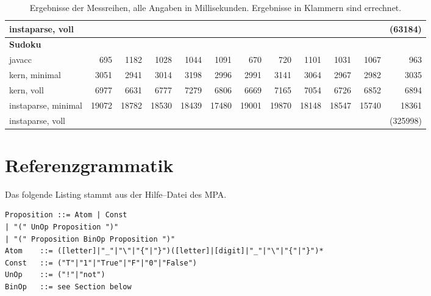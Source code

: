 \documentclass[ngerman,a4paper,abstracton,open=right,twoside=false,toc=listofnumbered,bibtotocnumbered]{scrreprt}
\begin{document}
\begin{table}[!h]
{{\begin{tabular}{|l|r|r|r|r|r|r|r|r|r|r|r|}
				instaparse, voll   & \multicolumn{1}{l|}{} & \multicolumn{1}{l|}{} & \multicolumn{1}{l|}{} & \multicolumn{1}{l|}{} & \multicolumn{1}{l|}{} & \multicolumn{1}{l|}{} & \multicolumn{1}{l|}{} & \multicolumn{1}{l|}{} & \multicolumn{1}{l|}{} & \multicolumn{1}{l|}{} & (63184) \\ \hline
				\textbf{Sudoku} & \multicolumn{1}{l|}{} & \multicolumn{1}{l|}{} & \multicolumn{1}{l|}{} & \multicolumn{1}{l|}{} & \multicolumn{1}{l|}{} & \multicolumn{1}{l|}{} & \multicolumn{1}{l|}{} & \multicolumn{1}{l|}{} & \multicolumn{1}{l|}{} & \multicolumn{1}{l|}{} & \multicolumn{1}{l|}{} \\ \hline
				javacc  & 695 & 1182 & 1028 & 1044 & 1091 & 670 & 720 & 1101 & 1031 & 1067 & 963 \\ \hline
				kern, minimal   & 3051 & 2941 & 3014 & 3198 & 2996 & 2991 & 3141 & 3064 & 2967 & 2982 & 3035 \\ \hline
				kern, voll   & 6977 & 6631 & 6777 & 7279 & 6806 & 6669 & 7165 & 7054 & 6726 & 6852 & 6894 \\ \hline
				instaparse, minimal   & 19072 & 18782 & 18530 & 18439 & 17480 & 19001 & 19870 & 18148 & 18547 & 15740 & 18361 \\ \hline
				instaparse, voll   & \multicolumn{1}{l|}{} & \multicolumn{1}{l|}{} & \multicolumn{1}{l|}{} & \multicolumn{1}{l|}{} & \multicolumn{1}{l|}{} & \multicolumn{1}{l|}{} & \multicolumn{1}{l|}{} & \multicolumn{1}{l|}{} & \multicolumn{1}{l|}{} & \multicolumn{1}{l|}{} & (325998) \\ \hline
				\end{tabular}
			}
		}
		\label{Messergebnisse}
		\caption{Ergebnisse der Messreihen, alle Angaben in Millisekunden. Ergebnisse in Klammern sind errechnet.}
\end{table}

\newpage
\section{Referenzgrammatik}\label{refgrammatik}

Das folgende Listing stammt aus der Hilfe--Datei des MPA. \cite{mpa}

\begin{verbatim}	
Proposition	::=	Atom | Const
| "(" UnOp Proposition ")"
| "(" Proposition BinOp Proposition ")"
Atom	::=	([letter]|"_"|"\"|"{"|"}")([letter]|[digit]|"_"|"\"|"{"|"}")*
Const	::=	("T"|"1"|"True"|"F"|"0"|"False")
UnOp	::=	("!"|"not")
BinOp	::=	see Section below
\end{verbatim}
\end{document}
